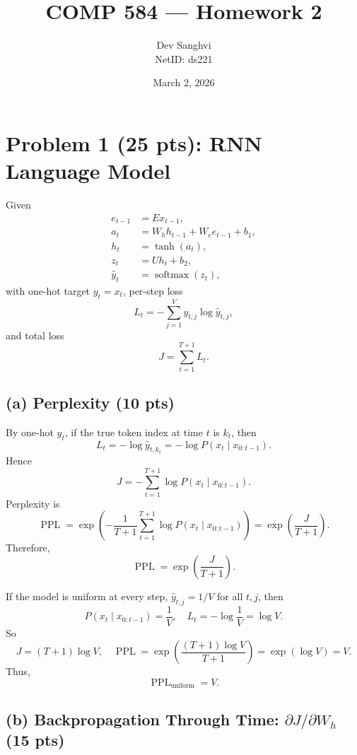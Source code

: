 \documentclass[11pt]{article}
\title{COMP 584 --- Homework 2}
\author{Dev Sanghvi \\ NetID: ds221}
\date{March 2, 2026}
\begin{document}
\maketitle

\section*{Problem 1 (25 pts): RNN Language Model}

Given
\[
\begin{aligned}
e_{t-1} &= E x_{t-1}, \\
a_t &= W_h h_{t-1} + W_e e_{t-1} + b_1, \\
h_t &= \tanh(a_t), \\
z_t &= U h_t + b_2, \\
\hat y_t &= \operatorname{softmax}(z_t),
\end{aligned}
\]
with one-hot target $y_t = x_t$, per-step loss
\[
L_t = -\sum_{j=1}^{V} y_{t,j} \log \hat y_{t,j},
\]
and total loss
\[
J = \sum_{t=1}^{T+1} L_t.
\]

\subsection*{(a) Perplexity (10 pts)}

By one-hot $y_t$, if the true token index at time $t$ is $k_t$, then
\[
L_t = -\log \hat y_{t,k_t} = -\log P(x_t \mid x_{0:t-1}).
\]
Hence
\[
J = -\sum_{t=1}^{T+1} \log P(x_t \mid x_{0:t-1}).
\]
Perplexity is
\[
\operatorname{PPL} = \exp\!\left(-\frac{1}{T+1}\sum_{t=1}^{T+1} \log P(x_t \mid x_{0:t-1})\right)
= \exp\!\left(\frac{J}{T+1}\right).
\]
Therefore,
\[
\boxed{\operatorname{PPL} = \exp\!\left(\frac{J}{T+1}\right)}.
\]

If the model is uniform at every step, $\hat y_{t,j} = 1/V$ for all $t,j$, then
\[
P(x_t \mid x_{0:t-1}) = \frac{1}{V},\quad
L_t = -\log\frac{1}{V} = \log V.
\]
So
\[
J = (T+1)\log V,
\quad
\operatorname{PPL} = \exp\!\left(\frac{(T+1)\log V}{T+1}\right)=\exp(\log V)=V.
\]
Thus,
\[
\boxed{\operatorname{PPL}_{\text{uniform}} = V}.
\]

\subsection*{(b) Backpropagation Through Time: $\partial J/\partial W_h$ (15 pts)}
\end{document}
